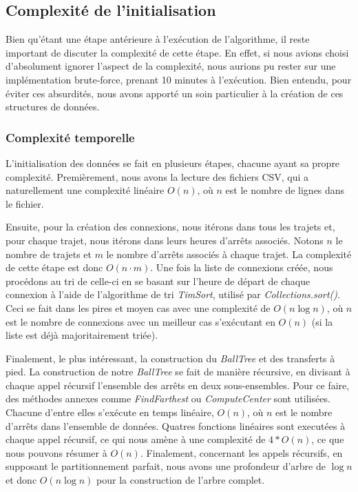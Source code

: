 \documentclass[12pt]{article}
\begin{document}
\newpage
\subsection{Complexité de l'initialisation}
Bien qu'étant une étape antérieure à l'exécution de l'algorithme, il reste important de discuter la complexité de cette étape. En effet, si nous avions choisi d'absolument ignorer
l'aspect de la complexité, nous aurions pu rester sur une implémentation brute-force, prenant 10 minutes à l'exécution. Bien entendu, pour éviter ces absurdités, nous avons apporté
un soin particulier à la création de ces structures de données.

\subsubsection{Complexité temporelle}
\label{sec:complexitetempinit}
L'initialisation des données se fait en plusieurs étapes, chacune ayant sa propre complexité. Premièrement, nous avons la lecture des fichiers CSV, qui a naturellement une complexité
linéaire $O(n)$, où $n$ est le nombre de lignes dans le fichier. 

Ensuite, pour la création des connexions, nous itérons dans tous les trajets et, pour chaque trajet, nous itérons dans leurs heures d'arrêts associés. Notons $n$ le nombre de trajets et $m$ le 
nombre d'arrêts associés à chaque trajet. La complexité de cette étape est donc $O(n \cdot m)$. Une fois la liste de connexions créée, nous procédons au tri de celle-ci en se basant sur 
l'heure de départ de chaque connexion à l'aide de l'algorithme de tri \emph{TimSort}, utilisé par \emph{Collections.sort()}. Ceci se fait dans les pires et
moyen cas avec une complexité de $O(n \log n)$, où $n$ est le nombre de connexions avec un meilleur cas s'exécutant en $O(n)$ (si la liste est déjà majoritairement triée).

Finalement, le plus intéressant, la construction du \emph{BallTree} et des transferts à pied. La construction de notre \emph{BallTree} se fait de manière récursive, en divisant à chaque appel 
récursif l'ensemble des arrêts en deux sous-ensembles. Pour ce faire, des méthodes annexes comme \emph{FindFarthest} ou \emph{ComputeCenter} sont utilisées. Chacune d'entre elles s'exécute en 
temps linéaire, $O(n)$, où $n$ est le nombre d'arrêts dans l'ensemble de données. Quatres fonctions linéaires sont executées à chaque appel récursif, ce qui nous amène à une complexité de 
$4 * O(n)$, ce que nous pouvons résumer à $O(n)$. Finalement, concernant les appels récursifs, en supposant le partitionnement parfait, nous avons une profondeur d'arbre de $\log n$ et donc 
$O(n \log n)$ pour la construction de l'arbre complet.
\end{document}
